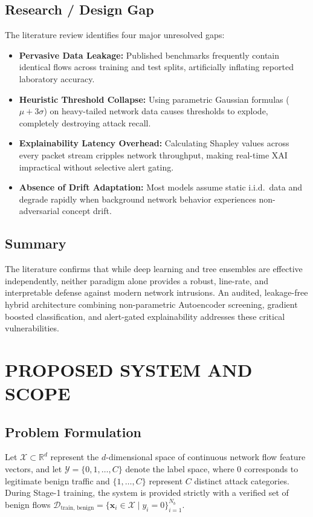 \documentclass[12pt,a4paper]{report}
\begin{document}
\section{Research / Design Gap}
The literature review identifies four major unresolved gaps:
\begin{itemize}
    \item \textbf{Pervasive Data Leakage:} Published benchmarks frequently contain identical flows across training and test splits, artificially inflating reported laboratory accuracy.
    \item \textbf{Heuristic Threshold Collapse:} Using parametric Gaussian formulas ($\mu + 3\sigma$) on heavy-tailed network data causes thresholds to explode, completely destroying attack recall.
    \item \textbf{Explainability Latency Overhead:} Calculating Shapley values across every packet stream cripples network throughput, making real-time XAI impractical without selective alert gating.
    \item \textbf{Absence of Drift Adaptation:} Most models assume static i.i.d.\ data and degrade rapidly when background network behavior experiences non-adversarial concept drift.
\end{itemize}

\section{Summary}
The literature confirms that while deep learning and tree ensembles are effective independently, neither paradigm alone provides a robust, line-rate, and interpretable defense against modern network intrusions. An audited, leakage-free hybrid architecture combining non-parametric Autoencoder screening, gradient boosted classification, and alert-gated explainability addresses these critical vulnerabilities.

\clearpage
\chapter{PROPOSED SYSTEM AND SCOPE}\label{ch:proposed_system}

\section{Problem Formulation}
Let $\mathcal{X} \subset \mathbb{R}^d$ represent the $d$-dimensional space of continuous network flow feature vectors, and let $\mathcal{Y} = \{0, 1, \dots, C\}$ denote the label space, where $0$ corresponds to legitimate benign traffic and $\{1, \dots, C\}$ represent $C$ distinct attack categories. During Stage-1 training, the system is provided strictly with a verified set of benign flows $\mathcal{D}_{\text{train, benign}} = \{\mathbf{x}_i \in \mathcal{X} \mid y_i = 0\}_{i=1}^{N_b}$.
\end{document}
